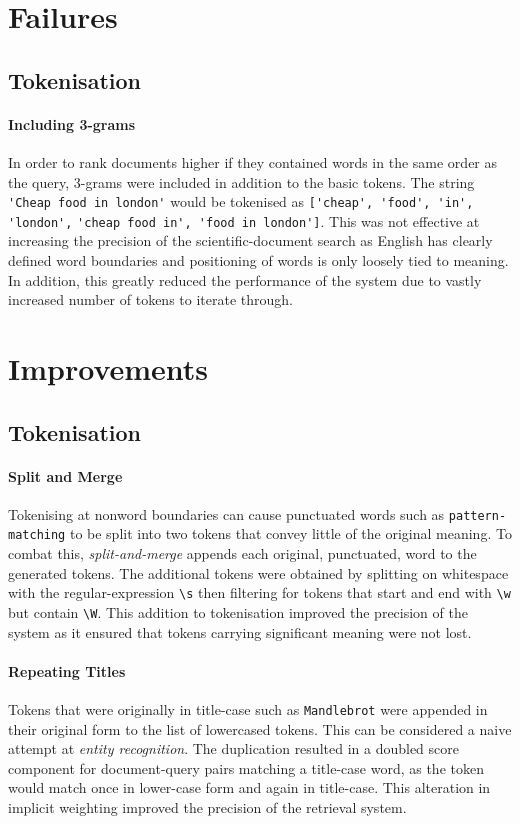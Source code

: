 \documentclass[11pt, a4paper, twocolumn]{article}   	%
\begin{document}
\section{Failures}
\subsection{Tokenisation}

\paragraph{Including 3-grams}
In order to rank documents higher if they contained words in the same order as the query, 3-grams were included in addition to the basic tokens. The string \verb|'Cheap food in london'| would be tokenised as \verb|['cheap', 'food', 'in', 'london',|
 \verb|'cheap food in', 'food in london']|. This was not effective at increasing the precision of the scientific-document search as English has clearly defined word boundaries and positioning of words is only loosely tied to meaning. In addition, this greatly reduced the performance of the system due to vastly increased number of tokens to iterate through.
\section{Improvements}
\subsection{Tokenisation}

 \paragraph{Split and Merge}
 Tokenising at nonword boundaries can cause punctuated words such as \verb|pattern-matching| to be split into two tokens that convey little of the original meaning. To combat this, \emph{split-and-merge} appends each original, punctuated, word to the generated tokens. The additional tokens were obtained by splitting on whitespace with the regular-expression \verb|\s| then filtering for tokens that start and end with \verb|\w| but contain \verb|\W|. This addition to tokenisation improved the precision of the system as it ensured that tokens carrying significant meaning were not lost.

\paragraph{Repeating Titles}
Tokens that were originally in title-case such as \verb|Mandlebrot| were appended in their original form to the list of lowercased tokens. This can be considered a naive attempt at \emph{entity recognition}. The duplication resulted in a doubled score component for document-query pairs matching a title-case word, as the token would match once in lower-case form and again in title-case. This alteration in implicit weighting improved the precision of the retrieval system.
\end{document}
